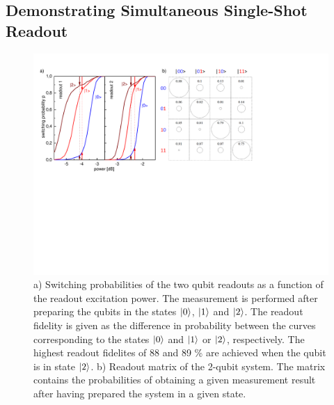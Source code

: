 \subsection{Demonstrating Simultaneous Single-Shot Readout}

\begin{figure}[ht!]
	\centering
		\includegraphics[width=1.\textwidth]{./material/papers/grover/figures/simultaneous_readout_characteristics}
	\caption[Switching probabilities of the two qubit readouts as a function of the readout excitation power]{a) Switching probabilities of the two qubit readouts as a function of the readout excitation power. The measurement is performed after preparing the qubits in the states $\left| 0 \right>$, $\left| 1 \right>$ and $\left| 2 \right>$. The readout fidelity is given as the difference in probability between the curves corresponding to the states $\left| 0 \right>$ and $\left| 1 \right>$ or $\left| 2 \right>$, respectively. The highest readout fidelites of 88 and 89 \% are achieved when the qubit is in state $\left| 2 \right>$. b) Readout matrix of the 2-qubit system. The matrix contains the probabilities of obtaining a given measurement result after having prepared the system in a given state. }
	\label{fig:QubitReadoutCharacteristics}
\end{figure}

